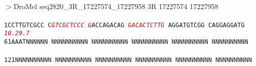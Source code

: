 \documentclass[11pt,twoside,reqno,a4paper]{article}
\begin{document}
\\
$>$DroMel	seq2820\_3R\_17227574\_17227958	3R	17227574	17227958 \\
 \\
\texttt{1\hspace*{3\charwidth}CCTTGTCGCC	C\textit{\textcolor{Red}{G}}\textit{\textcolor{Red}{T}}\textit{\textcolor{Red}{C}}\textit{\textcolor{Red}{G}}\textit{\textcolor{Red}{C}}\textit{\textcolor{Red}{T}}\textit{\textcolor{Red}{C}}\textit{\textcolor{Red}{C}}\textit{\textcolor{Red}{C}}	\textit{\textcolor{Red}{G}}ACCAGACAG	\textit{\textcolor{Red}{G}}\textit{\textcolor{Red}{A}}\textit{\textcolor{Red}{C}}\textit{\textcolor{Red}{A}}\textit{\textcolor{Red}{C}}\textit{\textcolor{Red}{T}}\textit{\textcolor{Red}{C}}\textit{\textcolor{Red}{T}}\textit{\textcolor{Red}{T}}\textit{\textcolor{Red}{G}}	AGGATGTCGG	CAGGAGGATG	\\
\hspace*{4\charwidth}\hspace*{1\charwidth}\hspace*{11\charwidth}\textit{\textcolor{Red}{10.2}}\hspace*{1\charwidth}\hspace*{1\charwidth}\hspace*{15\charwidth}\textit{\textcolor{Red}{9.7}}\hspace*{1\charwidth}\hspace*{1\charwidth}\hspace*{1\charwidth}\\
61\hspace*{2\charwidth}AAATNNNNNN	NNNNNNNNNN	NNNNNNNNNN	NNNNNNNNNN	NNNNNNNNNN	NNNNNNNNNN	\\
\hspace*{4\charwidth}\hspace*{1\charwidth}\hspace*{1\charwidth}\hspace*{1\charwidth}\hspace*{1\charwidth}\hspace*{1\charwidth}\hspace*{1\charwidth}\\
121\hspace*{1\charwidth}NNNNNNNNNN	NNNNNNNNNN	NNNNNNNNNN	NNNNNNNNNN	NNNNNNNNNN	NNNNNNNNNN	\\
\hspace*{4\charwidth}\hspace*{1\charwidth}\hspace*{1\charwidth}\hspace*{1\charwidth}\hspace*{1\charwidth}\hspace*{1\charwidth}\hspace*{1\charwidth}\\
}
\end{document}
